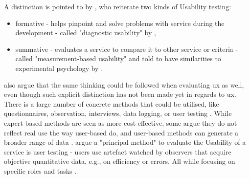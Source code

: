 A distinction is pointed to by \textcite{Juergen_et_all_2020}, who reiterate two kinds of Usability testing:

\begin{itemize}
    \item formative - helps pinpoint and solve problems with service during the development - called "diagnostic usability" by \textcite{Lewis_2014},
    \item summative - evaluates a service to compare it to other service or criteria - called "measurement-based usability" and told to have similarities to experimental psychology by \textcite{Lewis_2014}.
\end{itemize}

\textcite{Juergen_et_all_2020} also argue that the same thinking could be followed when evaluating \gls{ux} as well, even though such explicit distinction has not been made yet in regards to \gls{ux}.
There is a large number of concrete methods that could be utilised, like questionnaires, observation, interviews, data logging, or user testing \parencite{Juergen_et_all_2020}.
While expert-based methods are seen as more cost-effective, some argue they do not reflect real use the way user-based do, and user-based methods can generate a broader range of data \parencite{Juergen_et_all_2020}.
\textcite{Juergen_et_all_2020} argue a "principal method" to evaluate the Usability of a service is user testing - users use artefact watched by observers that acquire objective quantitative data, e.g., on efficiency or errors.
All while focusing on specific roles and tasks \parencite{Wegge_Zimmermann_2007,McCloskey_2014}.

